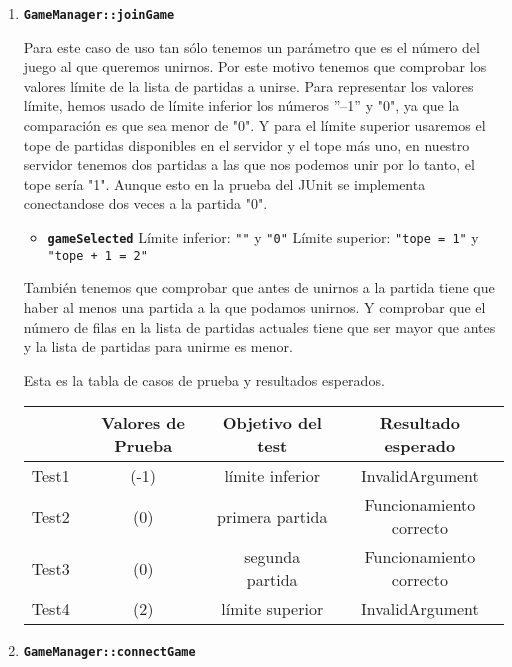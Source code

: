 \begin{enumerate}
{\begin{longtable}[c]{lccc}
\hline
\end{longtable}
}

\item \textbf{\texttt{GameManager::joinGame}}

Para este caso de uso tan sólo tenemos un parámetro que es el número del juego al que queremos unirnos. Por este motivo tenemos que comprobar los valores límite de la lista de partidas a unirse. Para representar los valores límite, hemos usado de límite inferior los números ''--1'' y "0", ya que la comparación es que sea menor de "0". Y para el límite superior usaremos el tope de partidas disponibles en el servidor y el tope más uno, en nuestro servidor tenemos dos partidas a las que nos podemos unir por lo tanto, el tope sería "1". Aunque esto en la prueba del JUnit se implementa conectandose dos veces a la partida "0".

\begin{itemize}
\item \textbf{\texttt{gameSelected}}
\subitem Límite inferior: \texttt{""} y \texttt{"0"}
\subitem Límite superior: \texttt{"tope = 1"} y \texttt{"tope + 1 = 2"}
\end{itemize}

También tenemos que comprobar que antes de unirnos a la partida tiene que haber al menos una partida a la que podamos unirnos. Y comprobar que el número de filas en la lista de partidas actuales tiene que ser mayor que antes y la lista de partidas para unirme es menor.

Esta es la tabla de casos de prueba y resultados esperados.

{\footnotesize
\begin{longtable}[c]{lccc}
 & \textbf{Valores de Prueba} & \textbf{Objetivo del test} & \textbf{Resultado esperado} \\
\hline \hline
\endhead

Test1 & (-1) & límite inferior & InvalidArgument\\
Test2 & (0) & primera partida & Funcionamiento correcto\\
Test3 & (0) & segunda partida & Funcionamiento correcto\\
Test4 & (2) & límite superior & InvalidArgument\\

\hline
\end{longtable}
}

\item \textbf{\texttt{GameManager::connectGame}}


\end{enumerate}
